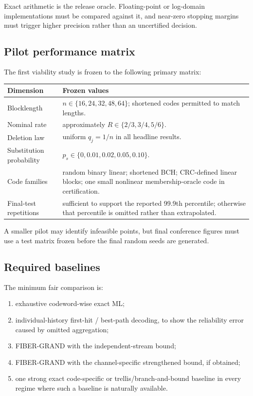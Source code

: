 \documentclass[11pt]{article}
\theoremstyle{definition}
\theoremstyle{remark}
\begin{document}
Exact arithmetic is the release oracle. Floating-point or log-domain implementations must be compared against it, and near-zero stopping margins must trigger higher precision rather than an uncertified decision.

\subsection{Pilot performance matrix}

The first viability study is frozen to the following primary matrix:

\begin{center}
\begin{tabularx}{0.96\textwidth}{@{}p{}X@{}}
\toprule
\textbf{Dimension} & \textbf{Frozen values}\\
\midrule
Blocklength & $n\in\{16,24,32,48,64\}$; shortened codes permitted to match lengths.\\
Nominal rate & approximately $R\in\{2/3,3/4,5/6\}$.\\
Deletion law & uniform $q_j=1/n$ in all headline results.\\
Substitution probability & $p_s\in\{0,0.01,0.02,0.05,0.10\}$.\\
Code families & random binary linear; shortened BCH; CRC-defined linear blocks; one small nonlinear membership-oracle code in certification.\\
Final-test repetitions & sufficient to support the reported 99.9th percentile; otherwise that percentile is omitted rather than extrapolated.\\
\bottomrule
\end{tabularx}
\end{center}

A smaller pilot may identify infeasible points, but final conference figures must use a test matrix frozen before the final random seeds are generated.

\subsection{Required baselines}

The minimum fair comparison is:
\begin{enumerate}
  \item exhaustive codeword-wise exact ML;
  \item individual-history first-hit / best-path decoding, to show the reliability error caused by omitted aggregation;
  \item FIBER-GRAND with the independent-stream bound;
  \item FIBER-GRAND with the channel-specific strengthened bound, if obtained;
  \item one strong exact code-specific or trellis/branch-and-bound baseline in every regime where such a baseline is naturally available.
\end{enumerate}
\end{document}
